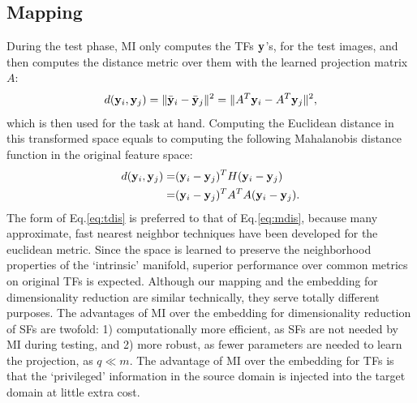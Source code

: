 \documentclass[10pt,twocolumn,letterpaper]{article}
\begin{document}

\subsection{Mapping}
During the test phase, MI only computes the TFs ${{\mathbf y}}$'s, for the
test images, and then computes the distance metric over them with the 
learned projection matrix $A$:
\begin{equation}
  \label{eq:tdis}
  d({{\mathbf y}}_i, {{\mathbf y}}_j) = \|\bar{{\mathbf y}}_i - \bar{{\mathbf y}}_j\|^2 = \|A^T{{\mathbf y}}_i - A^T{{\mathbf y}}_j\|^2, 
\end{equation}
which is then used for the task at hand. Computing the Euclidean
distance in this transformed space equals to computing the following
Mahalanobis distance function in the original feature space: 
%
 \begin{align}
\label{eq:mdis}
  d({{\mathbf y}}_i, {{\mathbf y}}_j) = &({{\mathbf y}}_i - {{\mathbf y}}_j )^T H ({{\mathbf y}}_i - {{\mathbf y}}_j)  \nonumber \\
                           = & ({{\mathbf y}}_i - {{\mathbf y}}_j )^T A^TA ({{\mathbf y}}_i - {{\mathbf y}}_j).  
 \end{align}
%
 The form of Eq.\ref{eq:tdis} is preferred to that of
 Eq.\ref{eq:mdis}, because many approximate, fast nearest neighbor
 techniques have been developed for the euclidean metric. Since the
 space is learned to preserve the neighborhood properties of the
 `intrinsic' manifold, superior performance over common metrics on
 original TFs is expected.  Although our mapping and the embedding for
 dimensionality reduction are similar technically, they serve totally
 different purposes. The advantages of MI over the embedding for
 dimensionality reduction of SFs are twofold: 1) computationally more
 efficient, as SFs are not needed by MI during testing, and 2) more
 robust, as fewer parameters are needed to learn the projection, as $q
 \ll m$. The advantage of MI over the embedding for TFs is that the
 `privileged' information in the source domain is injected into the target
 domain at little extra cost.



\end{document}

